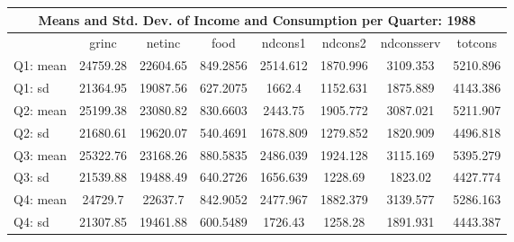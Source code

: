 \begin{tabular}{l*{7}{c}}
\hline\hline
\multicolumn{8}{c}{Means and Std. Dev. of Income and Consumption per Quarter: 1988}  \\
\hline    
            &       grinc&      netinc&        food&     ndcons1&     ndcons2&  ndconsserv&     totcons\\
\hline
Q1: mean         &    24759.28&    22604.65&    849.2856&    2514.612&    1870.996&    3109.353&    5210.896\\
Q1: sd     &    21364.95&    19087.56&    627.2075&      1662.4&    1152.631&    1875.889&    4143.386\\
Q2: mean        &    25199.38&    23080.82&    830.6603&     2443.75&    1905.772&    3087.021&    5211.907\\
Q2: sd      &    21680.61&    19620.07&    540.4691&    1678.809&    1279.852&    1820.909&    4496.818\\
Q3: mean        &    25322.76&    23168.26&    880.5835&    2486.039&    1924.128&    3115.169&    5395.279\\
Q3: sd      &    21539.88&    19488.49&    640.2726&    1656.639&     1228.69&     1823.02&    4427.774\\
Q4: mean         &     24729.7&     22637.7&    842.9052&    2477.967&    1882.379&    3139.577&    5286.163\\
Q4: sd     &    21307.85&    19461.88&    600.5489&     1726.43&     1258.28&    1891.931&    4443.387\\
\hline\hline
\end{tabular}
